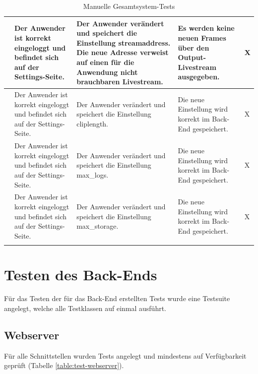 \begin{longtable}{| p{} | p{} | p{} | p{} | p{} |}
	\stepcounter{SysTestNumber}\arabic{SysTestNumber} & Der Anwender ist korrekt eingeloggt und befindet sich auf der Settings-Seite. & Der Anwender verändert und speichert die Einstellung \glqq{}streamaddress\grqq{}. Die neue Adresse verweist auf einen für die Anwendung  nicht brauchbaren Livestream. & Es werden keine neuen Frames über den Output-Livestream ausgegeben. & X \\ \hline
	
	\stepcounter{SysTestNumber}\arabic{SysTestNumber} & Der Anwender ist korrekt eingeloggt und befindet sich auf der Settings-Seite. & Der Anwender verändert und speichert die Einstellung \glqq{}cliplength\grqq{}. & Die neue Einstellung wird korrekt im Back-End gespeichert. & X \\ \hline
	
	\stepcounter{SysTestNumber}\arabic{SysTestNumber} & Der Anwender ist korrekt eingeloggt und befindet sich auf der Settings-Seite. & Der Anwender verändert und speichert die Einstellung \glqq{}max\_logs\grqq{}. & Die neue Einstellung wird korrekt im Back-End gespeichert. & X \\ \hline
	
	\stepcounter{SysTestNumber}\arabic{SysTestNumber} & Der Anwender ist korrekt eingeloggt und befindet sich auf der Settings-Seite. & Der Anwender verändert und speichert die Einstellung \glqq{}max\_storage\grqq{}. & Die neue Einstellung wird korrekt im Back-End gespeichert. & X \\ \hline
	
	
	\caption{Manuelle Gesamtsystem-Tests}
	\label{tab:manuelle_gesamtsystem_tests}
\end{longtable}

\section{Testen des Back-Ends}
Für das Testen der für das Back-End erstellten Tests wurde eine Testsuite angelegt, welche alle Testklassen auf einmal ausführt.
\subsection{Webserver}
Für alle Schnittstellen wurden Tests angelegt und mindestens auf Verfügbarkeit geprüft (Tabelle \ref{table:test-webserver}).

